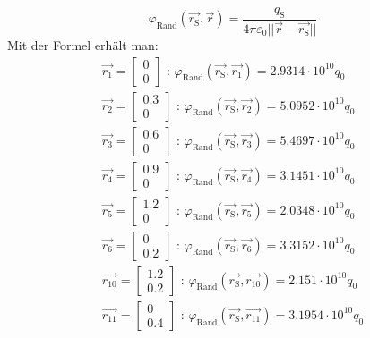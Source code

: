 \documentclass[Protokollheft.tex]{subfiles}
\begin{document}
$$\varphi_\text{Rand}(\vec{r_\text{S}},\vec{r})=\frac{q_\text{S}}{4\pi\varepsilon_0\vert\vert \vec{r}-\vec{r_\text{S}}\vert\vert} $$  
Mit der Formel erhält man:
\begin{eqnarray}
\vec{r_1}=\begin{bmatrix}
0 \\
0    
\end{bmatrix} \text{ :       }\varphi_\text{Rand}(\vec{r_\text{S}},\vec{r_1})= 2.9314 \cdot 10^{10}q_0\\
\vec{r_2}=\begin{bmatrix}
0.3 \\
0    
\end{bmatrix} \text{ :       }\varphi_\text{Rand}(\vec{r_\text{S}},\vec{r_2})= 5.0952 \cdot 10^{10}q_0\\
\vec{r_3}=\begin{bmatrix}
0.6 \\
0    
\end{bmatrix} \text{ :       }\varphi_\text{Rand}(\vec{r_\text{S}},\vec{r_3})= 5.4697 \cdot 10^{10}q_0\\
\vec{r_4}=\begin{bmatrix}
0.9 \\
0    
\end{bmatrix} \text{ :       }\varphi_\text{Rand}(\vec{r_\text{S}},\vec{r_4})= 3.1451 \cdot 10^{10}q_0\\
\vec{r_5}=\begin{bmatrix}
1.2 \\
0    
\end{bmatrix} \text{ :       }\varphi_\text{Rand}(\vec{r_\text{S}},\vec{r_5})= 2.0348 \cdot 10^{10}q_0\\
\vec{r_6}=\begin{bmatrix}
0 \\
0.2    
\end{bmatrix} \text{ :       }\varphi_\text{Rand}(\vec{r_\text{S}},\vec{r_6})= 3.3152 \cdot 10^{10}q_0\\
\vec{r_{10}}=\begin{bmatrix}
1.2 \\
0.2    
\end{bmatrix} \text{ :       }\varphi_\text{Rand}(\vec{r_\text{S}},\vec{r_{10}})= 2.151 \cdot 10^{10}q_0\\
\vec{r_{11}}=\begin{bmatrix}
0 \\
0.4    
\end{bmatrix} \text{ :       }\varphi_\text{Rand}(\vec{r_\text{S}},\vec{r_{11}})= 3.1954 \cdot 10^{10}q_0\\

\end{eqnarray}
\end{document}
